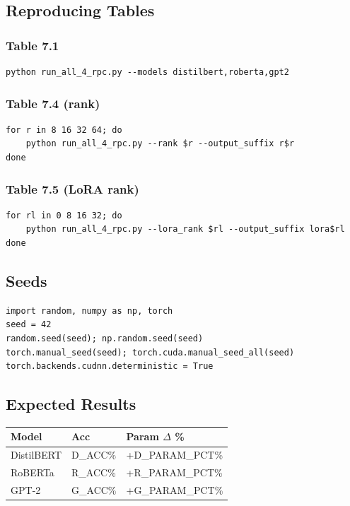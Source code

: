 \subsection{Reproducing Tables}

\subsubsection{Table 7.1}
\begin{lstlisting}
python run_all_4_rpc.py --models distilbert,roberta,gpt2
\end{lstlisting}

\subsubsection{Table 7.4 (rank)}
\begin{lstlisting}
for r in 8 16 32 64; do
    python run_all_4_rpc.py --rank $r --output_suffix r$r
done
\end{lstlisting}

\subsubsection{Table 7.5 (LoRA rank)}
\begin{lstlisting}
for rl in 0 8 16 32; do
    python run_all_4_rpc.py --lora_rank $rl --output_suffix lora$rl
done
\end{lstlisting}

\subsection{Seeds}

\begin{lstlisting}
import random, numpy as np, torch
seed = 42
random.seed(seed); np.random.seed(seed)
torch.manual_seed(seed); torch.cuda.manual_seed_all(seed)
torch.backends.cudnn.deterministic = True
\end{lstlisting}

\subsection{Expected Results}

\begin{table}[H]
\centering
\small
\begin{tabular}{lll}
\toprule
\textbf{Model} & \textbf{Acc} & \textbf{Param $\Delta$ \%} \\
\midrule
DistilBERT & {{D\_ACC}}\% & +{{D\_PARAM\_PCT}}\% \\
RoBERTa & {{R\_ACC}}\% & +{{R\_PARAM\_PCT}}\% \\
GPT-2 & {{G\_ACC}}\% & +{{G\_PARAM\_PCT}}\% \\
\bottomrule
\end{tabular}
\end{table}

